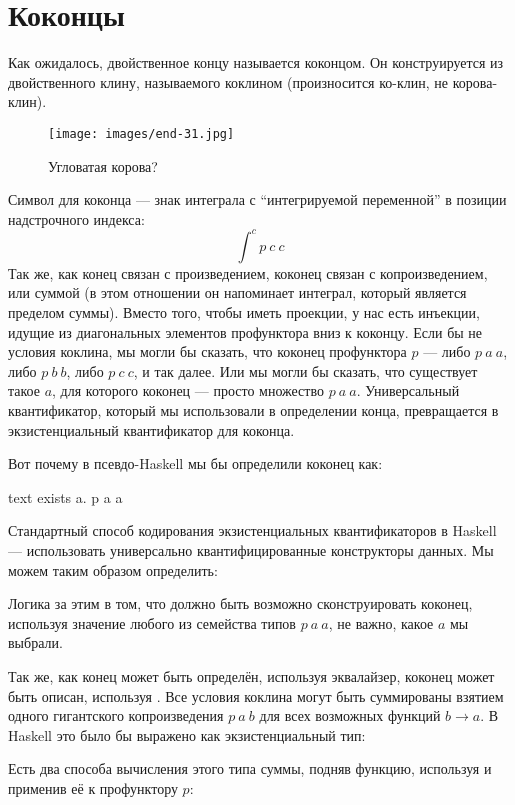 \section{Коконцы}
Как ожидалось, двойственное концу называется коконцом. Он конструируется
из двойственного клину, называемого коклином (произносится ко-клин, не
корова-клин).

\begin{figure}[H]
  \centering
  \texttt{[image: images/end-31.jpg]}
  \caption{Угловатая корова?}
\end{figure}

\noindent
Символ для коконца --- знак интеграла с ``интегрируемой
переменной'' в позиции надстрочного индекса:
\[\int^c p\ c\ c\]
Так же, как конец связан с произведением, коконец связан с
копроизведением, или суммой (в этом отношении он напоминает интеграл, который
является пределом суммы). Вместо того, чтобы иметь проекции, у нас есть инъекции,
идущие из диагональных элементов профунктора вниз к коконцу. Если бы
не условия коклина, мы могли бы сказать, что коконец
профунктора $p$ --- либо $p\ a\ a$, либо
$p\ b\ b$, либо $p\ c\ c$, и так далее. Или мы могли бы сказать, что
существует такое $a$, для которого коконец --- просто множество
$p\ a\ a$. Универсальный квантификатор, который мы использовали в
определении конца, превращается в экзистенциальный квантификатор для
коконца.

Вот почему в псевдо-Haskell мы бы определили коконец как:

\begin{snip}{text}
exists a. p a a
\end{snip}
Стандартный способ кодирования экзистенциальных квантификаторов в Haskell ---
использовать универсально квантифицированные конструкторы данных. Мы можем таким образом определить:

Логика за этим в том, что должно быть возможно сконструировать коконец,
используя значение любого из семейства типов $p\ a\ a$, не важно,
какое $a$ мы выбрали.

Так же, как конец может быть определён, используя эквалайзер, коконец может быть
описан, используя . Все условия коклина могут быть
суммированы взятием одного гигантского копроизведения $p\ a\ b$ для всех
возможных функций $b \to a$. В Haskell это было бы
выражено как экзистенциальный тип:

Есть два способа вычисления этого типа суммы, подняв функцию,
используя  и применив её к профунктору $p$:

